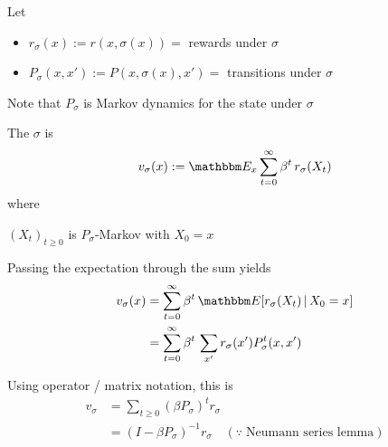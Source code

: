 \documentclass[dvipsnames]{beamer}
\begin{document}
\begin{frame}
    
    Let 
    \begin{itemize}
        \item $r_\sigma(x) := r(x, \sigma(x)) =$  rewards under $\sigma$
        \vspace{0.4em}
        \item $P_\sigma(x, x') := P(x, \sigma(x), x') =$ transitions under
            $\sigma$
    \end{itemize}
        
    \vspace{0.4em}
    \vspace{0.4em}
    Note that $P_\sigma$ is Markov dynamics for the state under $\sigma$
    \vspace{0.4em}
    \vspace{0.4em}
    \vspace{0.4em}

    The   $\sigma$ is
    \begin{equation*}
        v_\sigma(x)
        := \EE_x \sum_{t=0}^\infty \beta^t \, r_\sigma(X_t)
    \end{equation*}
    where
    \begin{center}
         $(X_t)_{t \geq 0}$ is $P_\sigma$-Markov with $X_0 = x$
    \end{center}



\end{frame}


\begin{frame}
    
    Passing the expectation through the sum yields
    \begin{align*}
        v_\sigma(x)
        & = \sum_{t=0}^\infty \beta^t \, \EE[ r_\sigma(X_t) \given X_0 = x]
        \\
        & = \sum_{t=0}^\infty \beta^t \, \sum_{x'} r_\sigma(x') P_\sigma^t(x, x')
    \end{align*}

    \vspace{0.4em}
    \vspace{0.4em}
    \vspace{0.4em}
    \vspace{0.4em}
    Using operator / matrix notation, this is
    \begin{align*}
        v_\sigma 
        & = \sum_{t \geq 0} (\beta P_\sigma)^t r_\sigma
        \\
        & = (I - \beta P_\sigma)^{-1} r_\sigma
        \quad (\because \; \text{Neumann series lemma})
    \end{align*}

\end{frame}
\end{document}
